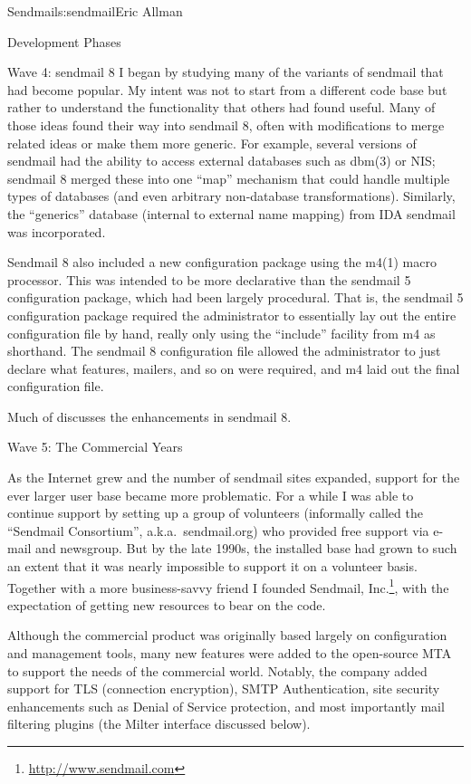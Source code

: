 \begin{aosachapter}{Sendmail}{s:sendmail}{Eric Allman}
\begin{aosasect1}{Development Phases}
\begin{aosasect2}{Wave 4: sendmail 8}
I began by studying many of the variants of sendmail that had become
popular.  My intent was not to start from a different code base but
rather to understand the functionality that others had found useful.
Many of those ideas found their way into sendmail 8, often with
modifications to merge related ideas or make them more generic. For
example, several versions of sendmail had the ability to access
external databases such as dbm(3) or NIS; sendmail 8 merged these into
one ``map'' mechanism that could handle multiple types of databases
(and even arbitrary non-database transformations).  Similarly, the
``generics'' database (internal to external name mapping)
from IDA sendmail was incorporated.

Sendmail 8 also included a new configuration package using the m4(1)
macro processor.
This was
intended to be more declarative than the sendmail 5 configuration
package, which had been largely procedural. That is, the sendmail 5
configuration package required the administrator to essentially lay
out the entire configuration file by hand, really only using the
``include'' facility from m4 as shorthand. The sendmail 8
configuration file allowed the administrator to just declare what
features, mailers, and so on were required, and m4 laid out the final
configuration file.

Much of  discusses the enhancements in
sendmail 8.

\end{aosasect2}

\begin{aosasect2}{Wave 5: The Commercial Years}

As the Internet grew and the number of sendmail sites expanded,
support for the ever larger user base became more problematic.  For a
while I was able to continue support by setting up a group of
volunteers (informally called the ``Sendmail Consortium'',
a.k.a.\ sendmail.org) who provided free support via e-mail and
newsgroup.  But by the late 1990s, the installed base had grown to such
an extent that it was nearly impossible to support it on a volunteer
basis.  Together with a more business-savvy friend I founded Sendmail,
Inc.\footnote{\url{http://www.sendmail.com}},
with the expectation of getting new resources to bear on the
code.

Although the commercial product was originally based largely on
configuration and management tools, many new features were added to
the open-source MTA to support the needs of the commercial world.
Notably, the company added support for TLS (connection encryption),
SMTP Authentication, site security enhancements such as Denial of
Service protection, and most importantly mail filtering plugins (the
Milter interface discussed below).


\end{aosasect2}
\end{aosasect1}
\end{aosachapter}
